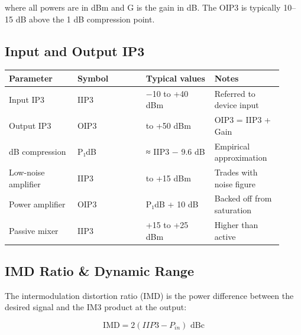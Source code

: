 where all powers are in dBm and G is the gain in dB. The OIP3 is typically 10–15 dB above the 1 dB compression point.

      

\subsection{Input and Output IP3}

      
        
        
        
        
        
        
        
      

{\small\begin{longtable}{>{\raggedright\arraybackslash}p{0.230\linewidth}>{\raggedright\arraybackslash}p{0.230\linewidth}>{\raggedright\arraybackslash}p{0.230\linewidth}>{\raggedright\arraybackslash}p{0.230\linewidth}}
\hline
\textbf{Parameter} & \textbf{Symbol} & \textbf{Typical values} & \textbf{Notes} \\
\hline
Input IP3 & IIP3 & −10 to +40 dBm & Referred to device input \\
Output IP3 & OIP3 & 0 to +50 dBm & OIP3 = IIP3 + Gain \\
1 dB compression & P₁dB & ≈ IIP3 − 9.6 dB & Empirical approximation \\
Low-noise amplifier & IIP3 & 0 to +15 dBm & Trades with noise figure \\
Power amplifier & OIP3 & P₁dB + 10 dB & Backed off from saturation \\
Passive mixer & IIP3 & +15 to +25 dBm & Higher than active \\
\hline
\end{longtable}}

      

\subsection{IMD Ratio \& Dynamic Range}

      

The intermodulation distortion ratio (IMD) is the power difference between the desired signal and the IM3 product at the output:


      
\[\text{IMD} = 2(IIP3 - P_{in}) \text{ dBc}\]

